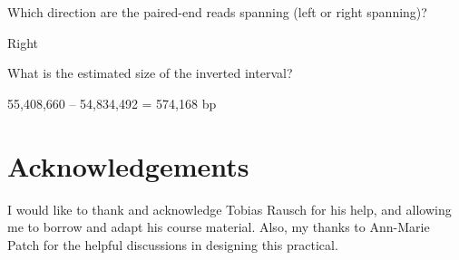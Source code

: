 \begin{questions}
Which direction are the paired-end reads spanning (left or right spanning)?  
\begin{answer}
Right
\end{answer}
What is the estimated size of the inverted interval? 
\begin{answer}
55,408,660 – 54,834,492 = 574,168 bp
\end{answer}
\end{questions}

\section{Acknowledgements}

I would like to thank and acknowledge Tobias Rausch for his help, and allowing me to borrow and adapt his course material. Also, my thanks to Ann-Marie Patch for the helpful discussions in designing this practical. 


